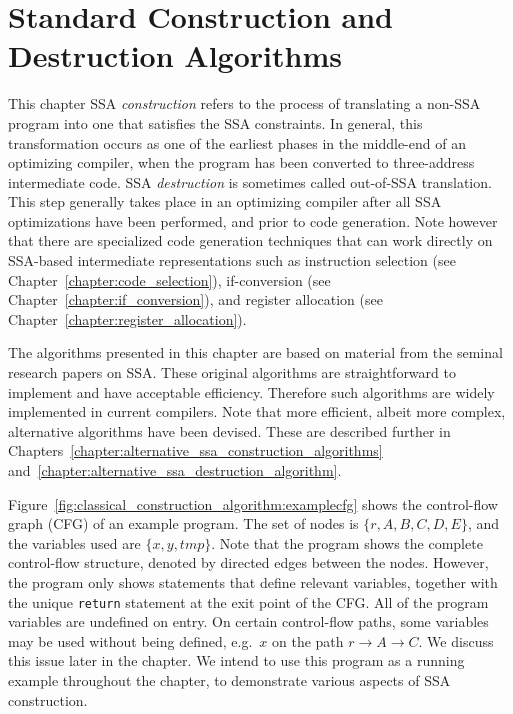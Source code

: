 \chapter{Standard Construction and Destruction Algorithms }
\label{chapter:classical_construction_algorithm}


{ 

  This chapter %
  SSA \emph{construction} refers to the process of translating a non-SSA program into one that satisfies the SSA constraints. 
  In general, this transformation occurs as one of the earliest phases in the middle-end of an optimizing compiler, when the program has been converted to three-address intermediate code. 
  SSA \emph{destruction} is sometimes called out-of-SSA translation. 
  This step generally takes place in an optimizing compiler after all SSA optimizations have been performed, and prior to code generation. 
  Note however that there are specialized code generation techniques that can work directly on SSA-based intermediate representations such as instruction selection (see Chapter~\ref{chapter:code_selection}), if-conversion (see Chapter~\ref{chapter:if_conversion}), and register allocation (see Chapter~\ref{chapter:register_allocation}).

  The algorithms presented in this chapter are based on material from the seminal research papers on SSA. 
  These original algorithms are straightforward to implement and have acceptable efficiency. 
  Therefore such algorithms are widely implemented in current compilers. 
  Note that more efficient, albeit more complex, alternative algorithms have been devised. 
  These are described further in Chapters~\ref{chapter:alternative_ssa_construction_algorithms} and~\ref{chapter:alternative_ssa_destruction_algorithm}.

  Figure~\ref{fig:classical_construction_algorithm:examplecfg} shows the control-flow graph (CFG) of an example program. 
  The set of nodes is $\{ r, A, B, C, D, E\}$, and the variables used are $\{ x, y, \textit{tmp} \}$. 
  Note that the program shows the complete control-flow structure, denoted by directed edges between the nodes. 
  However, the program only shows statements that define relevant variables, together with the unique \texttt{return} statement at the exit point of the CFG. 
  All of the program variables are undefined on entry. 
  On certain control-flow paths, some variables may be used without being defined, e.g.\ $x$ on the path $r \rightarrow A \rightarrow C$. 
  We discuss this issue later in the chapter. 
  We intend to use this program as a running example throughout the chapter, to demonstrate various aspects of SSA construction.


}
